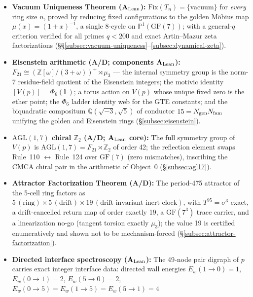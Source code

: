 \documentclass[11pt]{article}
\theoremstyle{remark}
\newcommand{\GF}[1]{\ensuremath{\mathrm{GF}(#1)}}
\newcommand{\CatAL}{\texorpdfstring{\ensuremath{\textbf{A}_{\rm Lean}}}{A-Lean}}
\newcommand{\CatAD}{\textbf{A/D}}
\begin{document}
\begin{itemize}[leftmargin=2em,itemsep=2pt,topsep=4pt]
  \item \textbf{Vacuum Uniqueness Theorem (\CatAL{}):}
        $\mathrm{Fix}(T_n) = \{\text{vacuum}\}$ for \emph{every} ring size
        $n$, proved by reducing fixed configurations to the golden
        M\"obius map $\mu(x) = (1+x)^{-1}$, a single 8-cycle on
        $\mathbb{P}^1(\GF{7})$; with a general-$q$ criterion verified for
        all primes $q < 200$ and exact Artin--Mazur zeta factorizations
        (§§\ref{subsec:vacuum-uniqueness}--\ref{subsec:dynamical-zeta}).
  \item \textbf{Eisenstein arithmetic (\CatAD{}; components \CatAL{}):}
        $F_{21} \cong (\mathbb{Z}[\omega]/(3{+}\omega))^{+} \rtimes \mu_3$
        --- the internal symmetry group is the norm-7 residue-field
        quotient of the Eisenstein integers; the motivic identity
        $[V(p)] = \Phi_6(\mathbb{L})$; a torus action on $V(p)$ whose
        unique fixed zero is the ether point; the $\Phi_6$ ladder
        identity web for the GTE constants; and the biquadratic compositum
        $\mathbb{Q}(\sqrt{-3},\sqrt{5})$ of conductor
        $15 = N_{\rm gen} N_{\rm fam}$ unifying the golden and Eisenstein
        rings (§\ref{subsec:eisenstein}).
  \item \textbf{$\mathrm{AGL}(1,7)$ chiral $\mathbb{Z}_2$ (\CatAD{};
        \CatAL{} core):} The full symmetry group of $V(p)$ is
        $\mathrm{AGL}(1,7) = F_{21} \rtimes \mathbb{Z}_2$ of order 42; the
        reflection element swaps Rule~110 $\leftrightarrow$ Rule~124 over
        $\GF{7}$ (zero mismatches), inscribing the CMCA chiral pair in the
        arithmetic of Object~0 (§\ref{subsec:agl17}).
  \item \textbf{Attractor Factorization Theorem (\CatAD{}):} The
        period-475 attractor of the 5-cell ring factors as
        $5\,(\text{ring}) \times 5\,(\text{drift}) \times
        19\,(\text{drift-invariant inert clock})$, with $T^{95} = \sigma^3$
        exact, a drift-cancelled return map of order exactly 19, a
        $\GF{7^3}$ trace carrier, and a linearization no-go (tangent
        torsion exactly $\mu_3$); the value 19 is certified enumeratively
        and shown not to be mechanism-forced
        (§\ref{subsec:attractor-factorization}).
  \item \textbf{Directed interface spectroscopy (\CatAL{}):} The 49-node
        pair digraph of $p$ carries exact integer interface data: directed
        wall energies $E_w(1{\to}0) = 1$, $E_w(0{\to}1) = 2$,
        $E_w(5{\to}0) = 2$, $E_w(0{\to}5) = E_w(1{\to}5) = E_w(5{\to}1) = 4$

\end{itemize}
\end{document}
